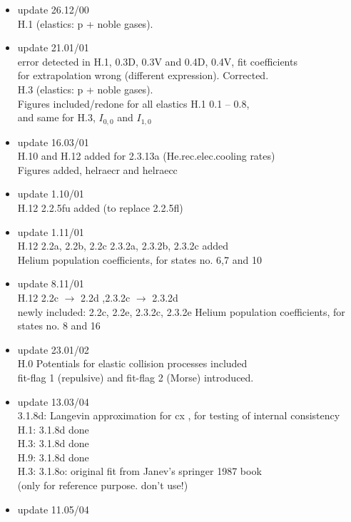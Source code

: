 \documentclass[12pt,dvips]{article}
\begin{document}
\begin{itemize}
  H.2 2.26B0 and H.2 2.26B1 added (ionization rates for Iron).
 \item update  26.12/00 \\
  H.1 (elastics: p + noble gases).
 \item update  21.01/01 \\
  error detected in H.1, 0.3D, 0.3V and 0.4D, 0.4V, fit coefficients\\
  for extrapolation wrong (different expression). Corrected.\\
  H.3 (elastics: p + noble gases).\\
  Figures included/redone for all elastics H.1  0.1 -- 0.8, \\
  and same for H.3, $I_{0,0}$ and $I_{1,0}$
 \item update  16.03/01 \\
  H.10 and H.12 added for 2.3.13a (He.rec.elec.cooling rates)\\
  Figures added, helraecr and helraecc
 \item update  1.10/01 \\
  H.12  2.2.5fu added (to replace 2.2.5fl)
 \item update  1.11/01 \\
  H.12  2.2a, 2.2b, 2.2c 2.3.2a, 2.3.2b, 2.3.2c added \\
  Helium population coefficients, for states no. 6,7 and 10
 \item update  8.11/01 \\
  H.12  2.2c $\rightarrow$ 2.2d ,2.3.2c $\rightarrow$ 2.3.2d \\
  newly included: 2.2c, 2.2e,  2.3.2c,  2.3.2e
  Helium population coefficients, for states no. 8 and 16
 \item update  23.01/02 \\
  H.0  Potentials for elastic collision processes included\\
  fit-flag 1 (repulsive) and fit-flag 2 (Morse) introduced.
 \item update  13.03/04 \\
  3.1.8d: Langevin approximation for cx , for testing of internal consistency\\
  H.1:  3.1.8d done  \\
  H.3:  3.1.8d done   \\
  H.9:  3.1.8d done   \\
  H.3:  3.1.8o:  original fit from Janev's springer 1987 book\\
  (only for reference purpose. don't use!)
 \item update  11.05/04 \\

\end{itemize}
\end{document}

